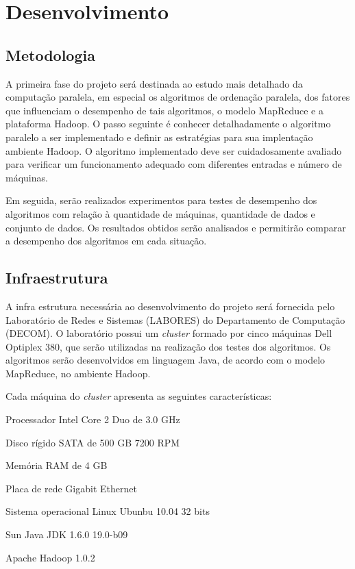 \chapter{Desenvolvimento}
\label{cap:desenvolvimento}

\section{Metodologia}

A primeira fase do projeto será destinada ao estudo mais detalhado da computação paralela, em especial os algoritmos de ordenação paralela, dos fatores que influenciam o desempenho de tais algoritmos, o modelo MapReduce e a plataforma Hadoop. O passo seguinte é conhecer detalhadamente o algoritmo paralelo a ser implementado e definir as estratégias para sua implentação ambiente Hadoop. 
O algoritmo implementado deve ser cuidadosamente avaliado para verificar um funcionamento adequado com diferentes entradas e número de máquinas. 

Em seguida, serão realizados experimentos para testes de desempenho dos algoritmos com relação à quantidade de máquinas, quantidade de dados e conjunto de dados.  Os resultados obtidos serão analisados e permitirão comparar a desempenho dos algoritmos em cada situação. 


\section{Infraestrutura}

A infra estrutura necessária ao desenvolvimento do projeto será fornecida pelo Laboratório de Redes e Sistemas (LABORES) do Departamento de Computação (DECOM). O laboratório possui um \textit{cluster} formado por cinco máquinas Dell Optiplex 380, que serão utilizadas na realização dos testes dos algoritmos. Os algoritmos serão desenvolvidos em linguagem Java, de acordo com o modelo MapReduce, no ambiente Hadoop. 

Cada máquina do \textit{cluster} apresenta as seguintes características:
\begin{packed_enum}
\item Processador Intel Core 2 Duo de 3.0 GHz
\item Disco rígido SATA de 500 GB 7200 RPM
\item Memória RAM de 4 GB
\item Placa de rede Gigabit Ethernet
\item Sistema operacional Linux Ubunbu 10.04 32 bits %
\item Sun Java JDK 1.6.0 19.0-b09 
\item Apache Hadoop 1.0.2
\end{packed_enum}


